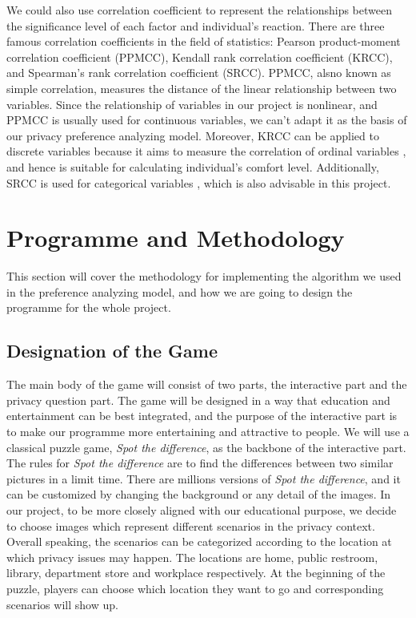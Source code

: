 \documentclass[a4paper,11pt]{article}
\begin{document}
We could also use correlation coefficient to represent the relationships between the significance level of each factor and individual's reaction. There are three famous correlation coefficients in the field of statistics: Pearson product-moment correlation coefficient (PPMCC), Kendall rank correlation coefficient (KRCC), and Spearman's rank correlation coefficient (SRCC). PPMCC, alsno known as simple correlation, measures the distance of the linear relationship between two variables\cite{ref1}. Since the relationship of variables in our project is nonlinear, and PPMCC is usually used for continuous variables, we can't adapt it as the basis of our privacy preference analyzing model. Moreover, KRCC can be applied to discrete variables because it aims to measure the correlation of ordinal variables \cite{Puka2011}, and hence is suitable for calculating individual's comfort level. Additionally, SRCC is used for categorical variables \cite{ref2}, which is also advisable in this project. 



\section{Programme and Methodology}

This section will cover the methodology for implementing the algorithm we used in the preference analyzing model, and how we are going to design the programme for the whole project.

\subsection{Designation of the Game}

The main body of the game will consist of two parts, the interactive part and the privacy question part. The game will be designed in a way that education and entertainment can be best integrated, and the purpose of the interactive part is to make our programme more entertaining and attractive to people. We will use a classical puzzle game, \textit{Spot the difference}, as the backbone of the interactive part. The rules for \textit{Spot the difference} are to find the differences between two similar pictures in a limit time. There are millions versions of \textit{Spot the difference}, and it can be customized by changing the background or any detail of the images. In our project, to be more closely aligned with our educational purpose, we decide to choose images which represent different scenarios in the privacy context. Overall speaking, the scenarios can be categorized according to the location at which privacy issues may happen. The locations are home, public restroom, library, department store and workplace respectively. At the beginning of the puzzle, players can choose which location they want to go and corresponding scenarios will show up.
\end{document}
